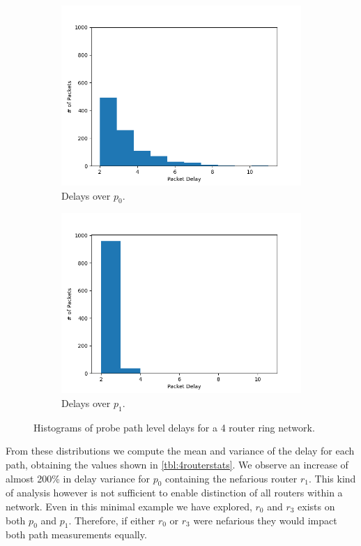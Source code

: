 \begin{figure}[H]
    \begin{subfigure}[b]{0.475\textwidth}
        \includegraphics[width=\textwidth]{figs/intro/p0_delayhist.png}
        \caption[]{Delays over $p_0$.}
    \end{subfigure}
    \begin{subfigure}[b]{0.475\textwidth}
        \includegraphics[width=\textwidth]{figs/intro/p1_delayhist.png}
        \caption[]{Delays over $p_1$.}
    \end{subfigure}
    \caption{Histograms of probe path level delays for a 4 router ring network.}
    \label{fig:ppdelayhist}
\end{figure}
\noindent From these distributions we compute the mean and variance of the delay for each path, obtaining the values shown in \cref{tbl:4routerstats}. We observe an increase of almost 200\% in delay variance for $p_0$ containing the nefarious router $r_1$. This kind of analysis however is not sufficient to enable distinction of all routers within a network. Even in this minimal example we have explored, $r_0$ and $r_3$ exists on both $p_0$ and $p_1$. Therefore, if either $r_0$ or $r_3$ were nefarious they would impact both path measurements equally.\par
